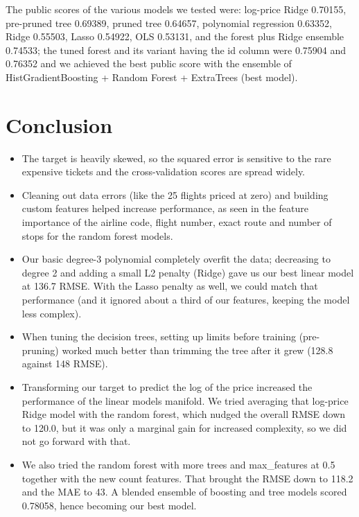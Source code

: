 \documentclass[11pt]{article}
\begin{document}
The public scores of the various models we tested were: log-price Ridge 0.70155, pre-pruned tree 0.69389, pruned tree 0.64657, polynomial regression 0.63352, Ridge 0.55503, Lasso 0.54922, OLS 0.53131, and the forest plus Ridge ensemble 0.74533; the tuned forest and its variant having the id column were 0.75904 and 0.76352 and we achieved the best public score with the ensemble of HistGradientBoosting + Random Forest + ExtraTrees (best model).

\section{Conclusion}

\begin{itemize}
  \item The target is heavily skewed, so the squared error is sensitive to the rare expensive tickets and the cross-validation scores are spread widely.
  \item Cleaning out data errors (like the 25 flights priced at zero) and building custom features helped increase performance, as seen in the feature importance of the airline code, flight number, exact route and number of stops for the random forest models.
  \item Our basic degree-3 polynomial completely overfit the data; decreasing to degree 2 and adding a small L2 penalty (Ridge) gave us our best linear model at 136.7 RMSE. With the Lasso penalty as well, we could match that performance (and it ignored about a third of our features, keeping the model less complex).
  \item When tuning the decision trees, setting up limits before training (pre-pruning) worked much better than trimming the tree after it grew (128.8 against 148 RMSE).
  \item Transforming our target to predict the log of the price increased the performance of the linear models manifold. We tried averaging that log-price Ridge model with the random forest, which nudged the overall RMSE down to 120.0, but it was only a marginal gain for increased complexity, so we did not go forward with that.
  \item We also tried the random forest with more trees and max\_features at 0.5 together with the new count features. That brought the RMSE down to 118.2 and the MAE to 43. A blended ensemble of boosting and tree models scored 0.78058, hence becoming our best model.
\end{itemize}
\end{document}
